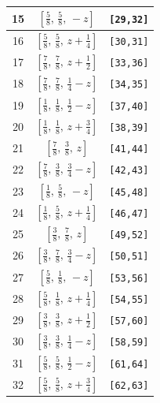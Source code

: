 \documentclass[fleqn,8pt]{jsarticle}
\begin{document}
\begin{longtable}{ccc}
15 & $\left[ \frac{5}{8},\, \frac{5}{8},\, - z \right]$ & {\tt [29,32]} \\ \hline
16 & $\left[ \frac{5}{8},\, \frac{5}{8},\, z + \frac{1}{4} \right]$ & {\tt [30,31]} \\ \hline
17 & $\left[ \frac{7}{8},\, \frac{7}{8},\, z + \frac{1}{2} \right]$ & {\tt [33,36]} \\ \hline
18 & $\left[ \frac{7}{8},\, \frac{7}{8},\, \frac{1}{4} - z \right]$ & {\tt [34,35]} \\ \hline
19 & $\left[ \frac{1}{8},\, \frac{1}{8},\, \frac{1}{2} - z \right]$ & {\tt [37,40]} \\ \hline
20 & $\left[ \frac{1}{8},\, \frac{1}{8},\, z + \frac{3}{4} \right]$ & {\tt [38,39]} \\ \hline
21 & $\left[ \frac{7}{8},\, \frac{3}{8},\, z \right]$ & {\tt [41,44]} \\ \hline
22 & $\left[ \frac{7}{8},\, \frac{3}{8},\, \frac{3}{4} - z \right]$ & {\tt [42,43]} \\ \hline
23 & $\left[ \frac{1}{8},\, \frac{5}{8},\, - z \right]$ & {\tt [45,48]} \\ \hline
24 & $\left[ \frac{1}{8},\, \frac{5}{8},\, z + \frac{1}{4} \right]$ & {\tt [46,47]} \\ \hline
25 & $\left[ \frac{3}{8},\, \frac{7}{8},\, z \right]$ & {\tt [49,52]} \\ \hline
26 & $\left[ \frac{3}{8},\, \frac{7}{8},\, \frac{3}{4} - z \right]$ & {\tt [50,51]} \\ \hline
27 & $\left[ \frac{5}{8},\, \frac{1}{8},\, - z \right]$ & {\tt [53,56]} \\ \hline
28 & $\left[ \frac{5}{8},\, \frac{1}{8},\, z + \frac{1}{4} \right]$ & {\tt [54,55]} \\ \hline
29 & $\left[ \frac{3}{8},\, \frac{3}{8},\, z + \frac{1}{2} \right]$ & {\tt [57,60]} \\ \hline
30 & $\left[ \frac{3}{8},\, \frac{3}{8},\, \frac{1}{4} - z \right]$ & {\tt [58,59]} \\ \hline
31 & $\left[ \frac{5}{8},\, \frac{5}{8},\, \frac{1}{2} - z \right]$ & {\tt [61,64]} \\ \hline
32 & $\left[ \frac{5}{8},\, \frac{5}{8},\, z + \frac{3}{4} \right]$ & {\tt [62,63]} \\
\end{longtable}
\renewcommand{\arraystretch}{1.2}
\end{document}
